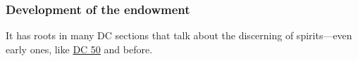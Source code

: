 	
		
	\subsubsection{Development of the endowment}
		\label{ENDOWMENT-development}
		
		It has roots in many DC sections that talk about the discerning of spirits---even early ones, like \hyperref[DC50]{DC 50} and before.